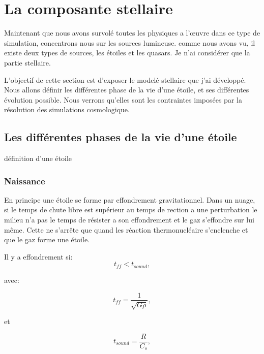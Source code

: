 \chapter{La composante stellaire}


Maintenant que nous avons survolé toutes les physiques a l’œuvre dans ce type de simulation, concentrons nous sur les sources lumineuse.
comme nous avons vu, il existe deux types de sources, les étoiles et les quasars. %
Je n'ai considérer que la partie stellaire.

L'objectif de cette section est d'exposer le modelé stellaire que j'ai développé.
Nous allons définir les différentes phase de la vie d'une étoile, et ses différentes évolution possible.
Nous verrons qu'elles sont les contraintes imposées par la résolution des simulations cosmologique.



\section{Les différentes phases de la vie d'une étoile}


définition d'une étoile


\subsection{Naissance}


En principe une étoile se forme par effondrement gravitationnel.
Dans un nuage, si le temps de chute libre est supérieur au temps de rection a une perturbation le milieu n'a pas le temps de résister a son effondrement et le gaz s'effondre sur lui même.
Cette ne s’arrête que quand les réaction thermonucléaire s'enclenche et que le gaz forme une étoile.

Il y a effondrement si:
\begin{equation}
t_{ff} < t_{sound},
\end{equation}

avec:
 
\begin{equation}
t_{ff} = \frac{1}{\sqrt{G \rho}},
\end{equation}

et 

\begin{equation}
t_{sound} = \frac{R}{C_s},
\end{equation}

